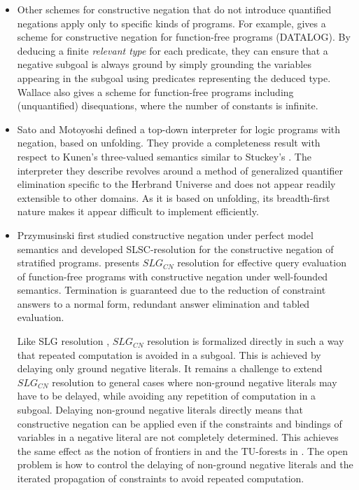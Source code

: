 \documentclass{tlp}
\begin{document}
\begin{itemize}
\item Other schemes for constructive negation that do not introduce
quantified negations apply only to specific kinds of programs. For
example, \cite{Foo} gives a scheme for constructive negation for
function-free programs (DATALOG). By deducing a finite \emph{relevant
type} for each predicate, they can ensure that a negative subgoal is
always ground by simply grounding the variables appearing in the
subgoal using predicates representing the deduced type. Wallace \cite{Wallace}
also gives a scheme for function-free programs including
(unquantified) disequations, where the number of constants is
infinite.

\item Sato and Motoyoshi \cite{Sato91} defined a top-down interpreter
for logic programs with negation, based on unfolding. They provide a
completeness result with respect to Kunen's three-valued semantics
\cite{Kunen} similar to Stuckey's \cite{Stuckey95}. The
interpreter they describe revolves around a method of generalized
quantifier elimination specific to the Herbrand Universe and does not
appear readily extensible to other domains. As it is based on
unfolding, its breadth-first nature makes it appear difficult to
implement efficiently.

\item  Przymusinski \cite{Przymusinski2} first studied constructive
negation under perfect model semantics and developed
SLSC-resolution for the constructive negation of stratified
programs. \cite{Liu99} presents $SLG_{CN}$ resolution for effective
query evaluation of function-free programs with constructive negation
under well-founded semantics. Termination is guaranteed due to the
reduction of constraint answers to a normal form, redundant answer
elimination and tabled evaluation.

Like SLG resolution \cite{Chen}, $SLG_{CN}$ resolution is formalized
directly in such a way that repeated computation is avoided in a
subgoal. This is achieved by delaying only ground negative
literals. It remains a challenge to extend $SLG_{CN}$ resolution to
general cases where non-ground negative literals may have to be
delayed, while avoiding any repetition of computation in a
subgoal. Delaying non-ground negative literals directly means that
constructive negation can be applied even if the constraints and
bindings of variables in a negative literal are not completely
determined. This achieves the same effect as the notion of frontiers
in \cite{Drabent,Fages} and the TU-forests in \cite{Damasio}. The
open problem is how to control the delaying of non-ground negative
literals and the iterated propagation of constraints to avoid
repeated computation. 


\end{itemize}
\end{document}
